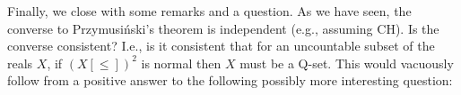 \documentclass[11pt]{amsart}
\theoremstyle{definition}
\theoremstyle{remark}
\newtheorem{claim}[theorem]{Claim}
\newcommand{\R}{\mathbb{R}}
\newcommand{\Bb}{\mathcal{B}}
\newcommand{\Aa}{\mathcal{A}}
\newcommand{\Vv}{\mathcal{V}}
\newcommand{\Uu}{\mathcal{U}}
\theoremstyle{plain}
\begin{document}


Finally, we close with some remarks and a question. As we have seen, the converse to Przymusi\'nski's theorem is independent (e.g., assuming CH). Is the converse consistent? I.e., is it consistent that for an uncountable subset of the reals $X$, if $(X[\leq])^2$ is normal then $X$ must be a Q-set. This would vacuously follow from a positive answer to the following possibly more interesting question:
\end{document}
